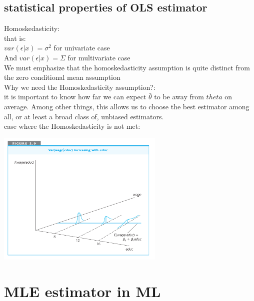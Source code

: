 \documentclass[a4paper,10pt]{article}
\begin{document}
\subsection{statistical properties of OLS estimator}
Homoskedasticity:\\
that is:\\
$var(\epsilon|x)=\sigma^2$ for univariate case\\
And $var(\epsilon|x)=\Sigma$ for multivariate case\\
We must emphasize that the homoskedasticity assumption is quite distinct from the zero conditional mean assumption\\
Why we need the Homoskedasticity assumption?:\\
it is important to know how far we can expect $\bar{\theta}$ to be away from $theta$ on average. Among other things, this allows us to choose the best estimator among all, or at least a broad class of, unbiased estimators. \\
case where the Homoskedasticity is not met:\\

\begin{center}

    \includegraphics[width=8cm]{9.png}
\end{center}
 


\section{MLE estimator in ML}
\end{document}
